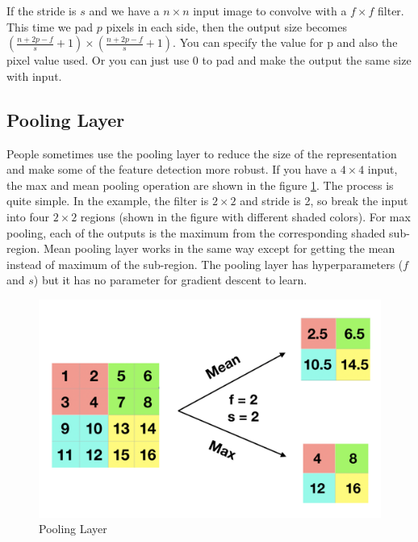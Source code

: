 \documentclass[
  12pt,
]{krantz}
\begin{document}
If the stride is \(s\) and we have a \(n \times n\) input image to convolve with a \(f \times f\) filter. This time we pad \(p\) pixels in each side, then the output size becomes \((\frac{n + 2p -f}{s} + 1) \times (\frac{n + 2p -f}{s} + 1)\). You can specify the value for p and also the pixel value used. Or you can just use 0 to pad and make the output the same size with input.

\hypertarget{pooling-layer}{%
\subsection{Pooling Layer}\label{pooling-layer}}

People sometimes use the pooling layer to reduce the size of the representation and make some of the feature detection more robust. If you have a \(4 \times 4\) input, the max and mean pooling operation are shown in the figure \ref{fig:poolinglayer}. The process is quite simple. In the example, the filter is \(2 \times 2\) and stride is 2, so break the input into four \(2 \times 2\) regions (shown in the figure with different shaded colors). For max pooling, each of the outputs is the maximum from the corresponding shaded sub-region. Mean pooling layer works in the same way except for getting the mean instead of maximum of the sub-region. The pooling layer has hyperparameters (\(f\) and \(s\)) but it has no parameter for gradient descent to learn.

\begin{figure}

{\centering \includegraphics[width=1\linewidth]{images/poolinglayer} 

}

\caption{Pooling Layer}\label{fig:poolinglayer}
\end{figure}
\end{document}
